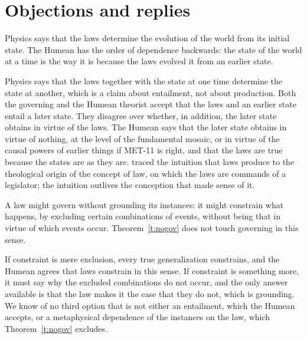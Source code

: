 \documentclass{situationist-preprint}
\begin{document}
\section{Objections and replies}\label{s:objections}

\begin{objection}\label{o:produce}
Physics says that the laws determine the evolution of the world from its initial state. The Humean has the order of dependence backwards: the state of the world at a time is the way it is because the laws evolved it from an earlier state.
\end{objection}

\begin{reply}
Physics says that the laws together with the state at one time determine the state at another, which is a claim about entailment, not about production. Both the governing and the Humean theorist accept that the laws and an earlier state entail a later state. They disagree over whether, in addition, the later state obtains in virtue of the laws. The Humean says that the later state obtains in virtue of nothing, at the level of the fundamental mosaic, or in virtue of the causal powers of earlier things if MET-11 is right, and that the laws are true because the states are as they are. \citet{Beebee2000} traced the intuition that laws produce to the theological origin of the concept of law, on which the laws are commands of a legislator; the intuition outlives the conception that made sense of it.
\end{reply}

\begin{objection}\label{o:constraint}
A law might govern without grounding its instances: it might constrain what happens, by excluding certain combinations of events, without being that in virtue of which events occur. Theorem~\ref{t:nogov} does not touch governing in this sense.
\end{objection}

\begin{reply}
If constraint is mere exclusion, every true generalization constrains, and the Humean agrees that laws constrain in this sense. If constraint is something more, it must say why the excluded combinations do not occur, and the only answer available is that the law makes it the case that they do not, which is grounding. We know of no third option that is not either an entailment, which the Humean accepts, or a metaphysical dependence of the instances on the law, which Theorem~\ref{t:nogov} excludes.
\end{reply}
\end{document}
